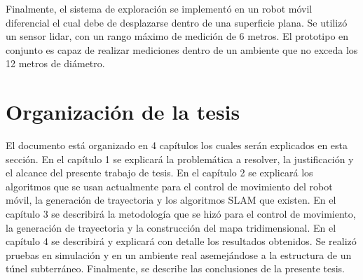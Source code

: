 Finalmente, el sistema de exploración se implementó en un robot móvil diferencial el 
cual debe de desplazarse dentro de una superficie plana. Se utilizó un sensor lidar, con
un rango máximo de medición de 6 metros. El prototipo en conjunto es capaz de realizar 
mediciones dentro de un ambiente que no exceda los 12 metros de diámetro.




\section{Organizaci\'on de la tesis}

El documento está organizado en 4 capítulos los cuales serán explicados en esta
sección. En el capítulo 1 se explicará la problemática a resolver, la justificación y 
el alcance del presente trabajo de tesis. En el capítulo 2 se explicará los algoritmos 
que se usan actualmente para el control de movimiento del robot móvil, la generación 
de trayectoria y  los algoritmos SLAM que existen. En el capítulo 3 se describirá la 
metodología que se hizó para el control de movimiento, la generación de trayectoria y 
la construcción del mapa tridimensional. En el capítulo 4 se describirá y explicará 
con detalle los resultados obtenidos. Se realizó pruebas en simulación y en un ambiente 
real asemejándose a la estructura de un túnel subterráneo. Finalmente, se describe las 
conclusiones de la presente tesis.